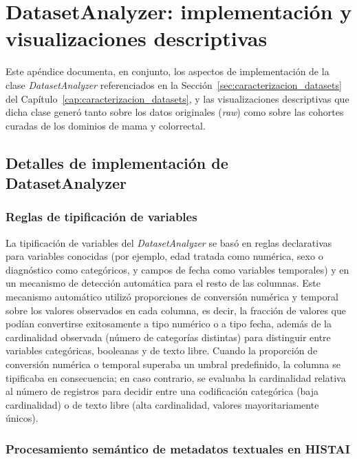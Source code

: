 \chapter{DatasetAnalyzer: implementación y visualizaciones descriptivas}
\label{appendix:visualizaciones_datasetanalyzer}

Este apéndice documenta, en conjunto, los aspectos de implementación de la clase \textit{DatasetAnalyzer} referenciados en la Sección~\ref{sec:caracterizacion_datasets} del Capítulo~\ref{cap:caracterizacion_datasets}, y las visualizaciones descriptivas que dicha clase generó tanto sobre los datos originales (\textit{raw}) como sobre las cohortes curadas de los dominios de mama y colorrectal.

\section{Detalles de implementación de DatasetAnalyzer}
\label{appendix:detalles_datasetanalyzer}

\subsection{Reglas de tipificación de variables}

La tipificación de variables del \textit{DatasetAnalyzer} se basó en reglas declarativas para variables conocidas (por ejemplo, edad tratada como numérica, sexo o diagnóstico como categóricos, y campos de fecha como variables temporales) y en un mecanismo de detección automática para el resto de las columnas. Este mecanismo automático utilizó proporciones de conversión numérica y temporal sobre los valores observados en cada columna, es decir, la fracción de valores que podían convertirse exitosamente a tipo numérico o a tipo fecha, además de la cardinalidad observada (número de categorías distintas) para distinguir entre variables categóricas, booleanas y de texto libre. Cuando la proporción de conversión numérica o temporal superaba un umbral predefinido, la columna se tipificaba en consecuencia; en caso contrario, se evaluaba la cardinalidad relativa al número de registros para decidir entre una codificación categórica (baja cardinalidad) o de texto libre (alta cardinalidad, valores mayoritariamente únicos).

\subsection{Procesamiento semántico de metadatos textuales en HISTAI}

